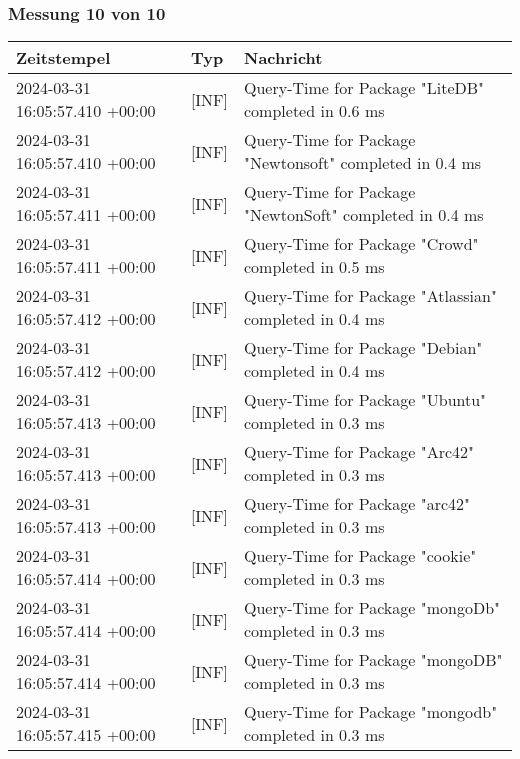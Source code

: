     \subsubsection{Messung 10 von 10} \label{subsubsec:MySQLMitIndex10von10}
        {
            {\small
                \begin{tabularx}{\textwidth}{|l|l|X|}
                    \hline
                    \textbf{Zeitstempel} & \textbf{Typ} & \textbf{Nachricht} \\
                    \hline
                    \endhead
                    2024-03-31 16:05:57.410 +00:00 & [INF] & Query-Time for Package "LiteDB" completed in 0.6 ms \\
                    2024-03-31 16:05:57.410 +00:00 & [INF] & Query-Time for Package "Newtonsoft" completed in 0.4 ms \\
                    2024-03-31 16:05:57.411 +00:00 & [INF] & Query-Time for Package "NewtonSoft" completed in 0.4 ms \\
                    2024-03-31 16:05:57.411 +00:00 & [INF] & Query-Time for Package "Crowd" completed in 0.5 ms \\
                    2024-03-31 16:05:57.412 +00:00 & [INF] & Query-Time for Package "Atlassian" completed in 0.4 ms \\
                    2024-03-31 16:05:57.412 +00:00 & [INF] & Query-Time for Package "Debian" completed in 0.4 ms \\
                    2024-03-31 16:05:57.413 +00:00 & [INF] & Query-Time for Package "Ubuntu" completed in 0.3 ms \\
                    2024-03-31 16:05:57.413 +00:00 & [INF] & Query-Time for Package "Arc42" completed in 0.3 ms \\
                    2024-03-31 16:05:57.413 +00:00 & [INF] & Query-Time for Package "arc42" completed in 0.3 ms \\
                    2024-03-31 16:05:57.414 +00:00 & [INF] & Query-Time for Package "cookie" completed in 0.3 ms \\
                    2024-03-31 16:05:57.414 +00:00 & [INF] & Query-Time for Package "mongoDb" completed in 0.3 ms \\
                    2024-03-31 16:05:57.414 +00:00 & [INF] & Query-Time for Package "mongoDB" completed in 0.3 ms \\
                    2024-03-31 16:05:57.415 +00:00 & [INF] & Query-Time for Package "mongodb" completed in 0.3 ms \\

\end{tabularx}}}
